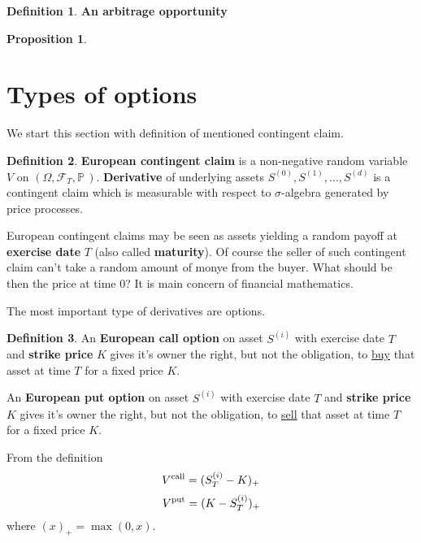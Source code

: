 \documentclass[a4paper,12pt, twoside]{book}
\newtheorem{prop}[thm]{Proposition}
\theoremstyle{definition}
\newtheorem{mydef}{Definition}[section]
\theoremstyle{remark}
\def\P{{\mathbb{P}}\,}
\begin{document}
\begin{mydef}
 \textbf{An arbitrage opportunity}
\end{mydef}

\begin{prop}
 
\end{prop}


\section{Types of options}
We start this section with definition of mentioned contingent claim.
\begin{mydef}
 \label{def:cc_eu}
 \textbf{European contingent claim} is a non-negative random variable $V$ on $(\Omega, \mathcal{F}_T, \P)$. \textbf{Derivative} of underlying assets $S^{(0)}, S^{(1)}, \ldots, S^{(d)}$ is a contingent claim which is measurable with respect to $\sigma$-algebra generated by price processes.
\end{mydef}
European contingent claims may be seen as assets yielding a random payoff at \textbf{exercise date} $T$ (also called \textbf{maturity}). Of course the seller of such contingent claim can't take a random amount of monye from the buyer. What should be then the price at time $0$? It is main concern of financial mathematics.

The most important type of derivatives are options.
\begin{mydef}
 An \textbf{European call option} on asset $S^{(i)}$ with exercise date $T$ and \textbf{strike price} $K$ gives it's owner the right, but not the obligation, to \underline{buy} that asset at time $T$ for a fixed price $K$.
 
 An \textbf{European put option} on asset $S^{(i)}$ with exercise date $T$ and \textbf{strike price} $K$ gives it's owner the right, but not the obligation, to \underline{sell} that asset at time $T$ for a fixed price $K$.
\end{mydef}
From the definition
\begin{equation}
 \label{eq:ecall}
 V\textsuperscript{call} = (S^{(i)}_T - K)_+
\end{equation}
\begin{equation}
 \label{eq:eput}
 V\textsuperscript{put} = (K - S^{(i)}_T )_+
\end{equation}
where $(x)_+ = \max(0,x)$.
\end{document}
